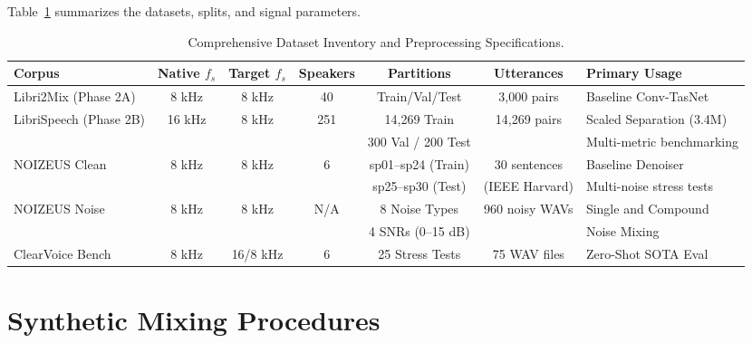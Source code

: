 \documentclass[11pt,a4paper]{report}
\begin{document}
Table~\ref{tab:dataset_summary} summarizes the datasets, splits, and signal parameters.

\begin{table}[H]
\centering
\caption{Comprehensive Dataset Inventory and Preprocessing Specifications.}
\label{tab:dataset_summary}
\small
\begin{tabularx}{\textwidth}{lcccccX}
\toprule
\textbf{Corpus} & \textbf{Native $f_s$} & \textbf{Target $f_s$} & \textbf{Speakers} & \textbf{Partitions} & \textbf{Utterances} & \textbf{Primary Usage} \\
\midrule
Libri2Mix (Phase 2A) & 8 kHz & 8 kHz & 40 & Train/Val/Test & 3,000 pairs & Baseline Conv-TasNet \\
LibriSpeech (Phase 2B)& 16 kHz & 8 kHz & 251 & 14,269 Train & 14,269 pairs & Scaled Separation (3.4M) \\
                      &       &       &     & 300 Val / 200 Test &           & Multi-metric benchmarking \\
NOIZEUS Clean         & 8 kHz & 8 kHz & 6   & sp01--sp24 (Train) & 30 sentences & Baseline Denoiser \\
                      &       &       &     & sp25--sp30 (Test)  & (IEEE Harvard) & Multi-noise stress tests \\
NOIZEUS Noise         & 8 kHz & 8 kHz & N/A & 8 Noise Types      & 960 noisy WAVs & Single and Compound \\
                      &       &       &     & 4 SNRs (0--15 dB)  &                & Noise Mixing \\
ClearVoice Bench      & 8 kHz & 16/8 kHz & 6 & 25 Stress Tests    & 75 WAV files   & Zero-Shot SOTA Eval \\
\bottomrule
\end{tabularx}
\end{table}

\section{Synthetic Mixing Procedures}
\end{document}
